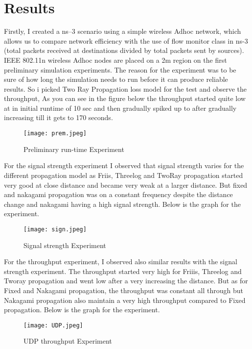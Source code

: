 \documentclass[conference]{IEEEtran}
\begin{document}
\section{Results}
Firstly, I created a ns–3 scenario using a simple wireless Adhoc network, which allows us to compare network efficiency with the use of flow monitor class in ns-3 (total packets received at destinations divided by total packets sent by sources). IEEE 802.11n wireless Adhoc nodes are placed on a 2m region on the first  preliminary simulation experiments. The reason for the experiment was to be sure of how long the simulation needs to run before it can produce reliable results. So i picked Two Ray Propagation loss model for the test and observe the throughput, As you can see in the figure below the throughput started quite low at in initial runtime of 10 sec and then gradually spiked up to after gradually increasing till it gets to 170 seconds.

\begin{figure}[htbp]
\centerline{\texttt{[image: prem.jpeg]}}
\caption{Preliminary run-time Experiment}
\label{fig}
\end{figure}

For the signal strength experiment I observed that signal strength varies for the different propagation model as Friis, Threelog and TwoRay propagation started very good at close distance and became very weak at a larger distance. But fixed and nakagami propagation was on a constant  frequency despite the distance change and nakagami having a high signal strength. Below is the graph for the experiment.

\begin{figure}[htbp]
\centerline{\texttt{[image: sign.jpeg]}}
\caption{Signal strength Experiment}
\label{fig}
\end{figure}
For the throughput experiment, I observed also similar results with the signal strength experiment. The throughput started very high for Friiis, Threelog and Tworay propagation and went low after a very increasing the distance. But as for Fixed and Nakagami propagation, the throughput was constant all through but Nakagami propagation also maintain a very high throughput compared to Fixed propagation. Below is the graph for the experiment.
\begin{figure}[htbp]
\centerline{\texttt{[image: UDP.jpeg]}}
\caption{UDP throughput Experiment}
\label{fig}
\end{figure}
\end{document}
